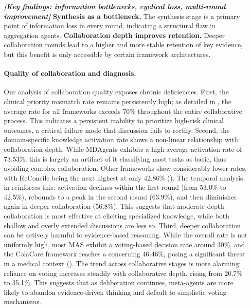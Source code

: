 \begin{custommdframed}
\textbf{\textit{[Key findings: information bottlenecks, cyclical loss, multi-round improvement]}}  \textbf{Synthesis as a bottleneck.} The synthesis stage is a primary point of information loss in every round, indicating a structural flaw in aggregation agents.  \textbf{Collaboration depth improves retention.} Deeper collaboration rounds lead to a higher and more stable retention of key evidence, but this benefit is only accessible by certain framework architectures.
\end{custommdframed}

\paragraph{Quality of collaboration and diagnosis.}

Our analysis of collaboration quality exposes chronic deficiencies. First, the clinical priority mismatch rate remains persistently high; as detailed in , the average rate for all frameworks exceeds 70\% throughout the entire collaborative process. This indicates a persistent inability to prioritize high-risk clinical outcomes, a critical failure mode that discussion fails to rectify. Second, the domain-specific knowledge activation rate shows a non-linear relationship with collaboration depth. While MDAgents exhibits a high average activation rate of 73.53\%, this is largely an artifact of it classifying most tasks as basic, thus avoiding complex collaboration. Other frameworks show considerably lower rates, with ReConcile being the next highest at only 42.86\% (). The temporal analysis in  reinforces this: activation declines within the first round (from 53.0\% to 42.5\%), rebounds to a peak in the second round (63.9\%), and then diminishes again in deeper collaboration (56.8\%). This suggests that moderate-depth collaboration is most effective at eliciting specialized knowledge, while both shallow and overly extended discussions are less so. Third, deeper collaboration can be actively harmful to evidence-based reasoning. While the overall rate is not uniformly high, most MAS exhibit a voting-based decision rate around 30\%, and the ColaCare framework reaches a concerning 46.46\%, posing a significant threat in a medical context (). The trend across collaborative stages is more alarming: reliance on voting increases steadily with collaborative depth, rising from 20.7\% to 35.1\%. This suggests that as deliberation continues, meta-agents are more likely to abandon evidence-driven thinking and default to simplistic voting mechanisms.

